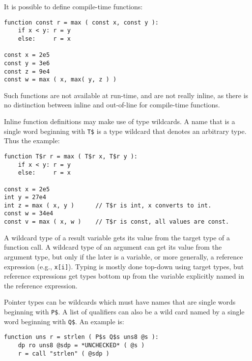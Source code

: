 \documentclass[12pt]{article}
\newenvironment{indpar}[1][0.3in]%
	{\begin{list}{}%
		     {\setlength{\itemsep}{0in}%
		      \setlength{\topsep}{0in}%
		      \setlength{\parsep}{1ex}%
		      \setlength{\labelwidth}{#1}%
		      \setlength{\leftmargin}{#1}%
		      \addtolength{\leftmargin}{\labelsep}}%
	 \item}%
	{\end{list}}
\begin{document}
It is possible to define compile-time functions:

\begin{indpar}\begin{verbatim}
function const r = max ( const x, const y ):
    if x < y: r = y
    else:     r = x

const x = 2e5
const y = 3e6
const z = 9e4
const w = max ( x, max( y, z ) )
\end{verbatim}\end{indpar}

Such functions are not available at run-time, and
are not really inline, as there is no
distinction between inline and out-of-line for compile-time functions.

Inline function definitions may make use of type wildcards.
A name that is a single word beginning with {\tt T\$}
is a type wildcard that denotes
an arbitrary type.  Thus the example:

\begin{indpar}\begin{verbatim}
function T$r r = max ( T$r x, T$r y ):
    if x < y: r = y
    else:     r = x

const x = 2e5
int y = 27e4
int z = max ( x, y )      // T$r is int, x converts to int.
const w = 34e4
const v = max ( x, w )    // T$r is const, all values are const.
\end{verbatim}\end{indpar}

A wildcard type of a result variable gets its value from the
target type of a function call.  A wildcard type of an argument
can get its value from the argument type, but only if the
later is a variable, or more generally, a reference expression
(e.g., {\tt x[i]}).
Typing is mostly done top-down using target types, but reference
expressions get types bottom up from the variable explicitly named
in the reference expression.

Pointer types can be wildcards which must have names that are
single words beginning with {\tt P\$}.  A list of qualifiers
can also be a wild card named by a single word beginning with
{\tt Q\$}.  An example is:

\begin{indpar}\begin{verbatim}
function uns r = strlen ( P$s Q$s uns8 @s ):
    dp ro uns8 @sdp = *UNCHECKED* ( @s )
    r = call "strlen" ( @sdp )
\end{verbatim}\end{indpar}
\end{document}
